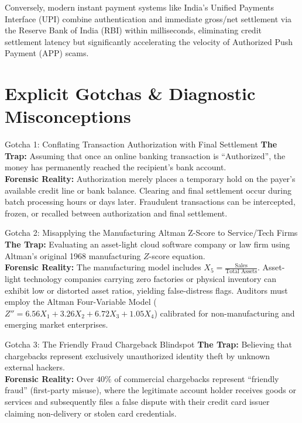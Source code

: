 Conversely, modern instant payment systems like India's Unified Payments Interface (UPI) combine authentication and immediate gross/net settlement via the Reserve Bank of India (RBI) within milliseconds, eliminating credit settlement latency but significantly accelerating the velocity of Authorized Push Payment (APP) scams.

\section{Explicit Gotchas \& Diagnostic Misconceptions}

\begin{trapbox}{Gotcha 1: Conflating Transaction Authorization with Final Settlement}
\textbf{The Trap:} Assuming that once an online banking transaction is ``Authorized'', the money has permanently reached the recipient's bank account.\\
\textbf{Forensic Reality:} Authorization merely places a temporary hold on the payer's available credit line or bank balance. Clearing and final settlement occur during batch processing hours or days later. Fraudulent transactions can be intercepted, frozen, or recalled between authorization and final settlement.
\end{trapbox}

\begin{trapbox}{Gotcha 2: Misapplying the Manufacturing Altman Z-Score to Service/Tech Firms}
\textbf{The Trap:} Evaluating an asset-light cloud software company or law firm using Altman's original 1968 manufacturing $Z$-score equation.\\
\textbf{Forensic Reality:} The manufacturing model includes $X_5 = \frac{\text{Sales}}{\text{Total Assets}}$. Asset-light technology companies carrying zero factories or physical inventory can exhibit low or distorted asset ratios, yielding false-distress flags. Auditors must employ the Altman Four-Variable Model ($Z'' = 6.56 X_1 + 3.26 X_2 + 6.72 X_3 + 1.05 X_4$) calibrated for non-manufacturing and emerging market enterprises.
\end{trapbox}

\begin{trapbox}{Gotcha 3: The Friendly Fraud Chargeback Blindspot}
\textbf{The Trap:} Believing that chargebacks represent exclusively unauthorized identity theft by unknown external hackers.\\
\textbf{Forensic Reality:} Over $40\%$ of commercial chargebacks represent ``friendly fraud'' (first-party misuse), where the legitimate account holder receives goods or services and subsequently files a false dispute with their credit card issuer claiming non-delivery or stolen card credentials.
\end{trapbox}

